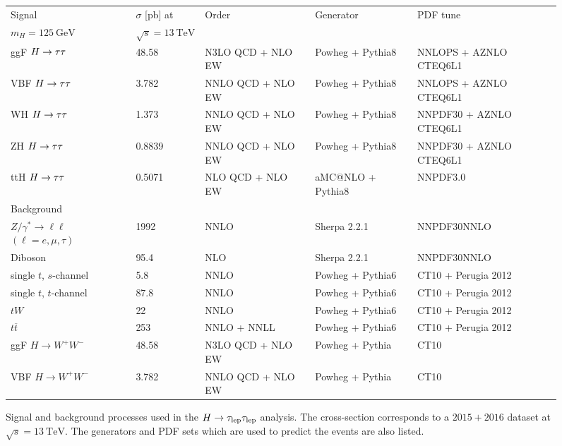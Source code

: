 \begin{sidewaysfigure}
    \centering
    \caption{Signal and background processes used in the $H \to \tau_\text{lep} \tau_\text{lep}$ analysis. The cross-section corresponds to a $2015+2016$ dataset
    at $\sqrt{s} = \SI{13}{\TeV}$. The generators and PDF sets which are used to predict the events are also listed.}\label{tab:processes:mc}
    \begin{tabular}{lllll}
        \toprule
        Signal  & $\sigma$ [\si{\pico\barn}] at & Order & Generator & PDF tune \\ 
        $m_H = \SI{125}{\GeV}$ & $\sqrt{s} = \SI{13}{\TeV}$ & & & \\ \midrule
        ggF $H \to \tau \tau$ & 48.58  \cite{YR4} & N3LO QCD + NLO EW & Powheg + Pythia8 & NNLOPS + AZNLO CTEQ6L1 \\
        VBF $H \to \tau \tau$ & 3.782  \cite{YR4} & NNLO QCD + NLO EW & Powheg + Pythia8 & NNLOPS + AZNLO CTEQ6L1 \\
        WH  $H \to \tau \tau$ & 1.373  \cite{YR4} & NNLO QCD + NLO EW & Powheg + Pythia8 & NNPDF30 + AZNLO CTEQ6L1\\
        ZH  $H \to \tau \tau$ & 0.8839 \cite{YR4} & NNLO QCD + NLO EW & Powheg + Pythia8 & NNPDF30 + AZNLO CTEQ6L1\\
        ttH $H \to \tau \tau$ & 0.5071 \cite{YR4} & NLO QCD + NLO EW & aMC@NLO + Pythia8 & NNPDF3.0 \\ \midrule
        Background & & & & \\ \midrule
        $Z/\gamma^* \to \ell\ell$ $(\ell = e, \mu, \tau)$ & 1992 \cite{xsec:z1,xsec:z2} & NNLO & Sherpa 2.2.1 & NNPDF30NNLO \\
        Diboson & 95.4 \cite{xsec:diboson1,xsec:diboson2}& NLO & Sherpa 2.2.1 & NNPDF30NNLO \\
        single $t$, $s$-channel & 5.8 \cite{xsec:singletschan} & NNLO & Powheg + Pythia6 & CT10 + Perugia 2012 \\
        single $t$, $t$-channel & 87.8 \cite{xsec:singlettchan}& NNLO & Powheg + Pythia6 & CT10 + Perugia 2012 \\
        $tW$ & 22 \cite{xsec:tW}& NNLO & Powheg + Pythia6 & CT10 + Perugia 2012 \\
        $t\overline{t}$ & 253 \cite{xsec:ttbar1,xsec:ttbar2,xsec:ttbar3,xsec:ttbar4,xsec:ttbar5} & NNLO + NNLL & Powheg + Pythia6 & CT10 + Perugia 2012 \\
        ggF $H \to W^+ W^-$ & 48.58 \cite{YR4} & N3LO QCD + NLO EW & Powheg + Pythia & CT10 \\
        VBF $H \to W^+ W^-$ & 3.782 \cite{YR4}& NNLO QCD + NLO EW & Powheg + Pythia & CT10 \\
        \bottomrule
    \end{tabular}
\end{sidewaysfigure}
